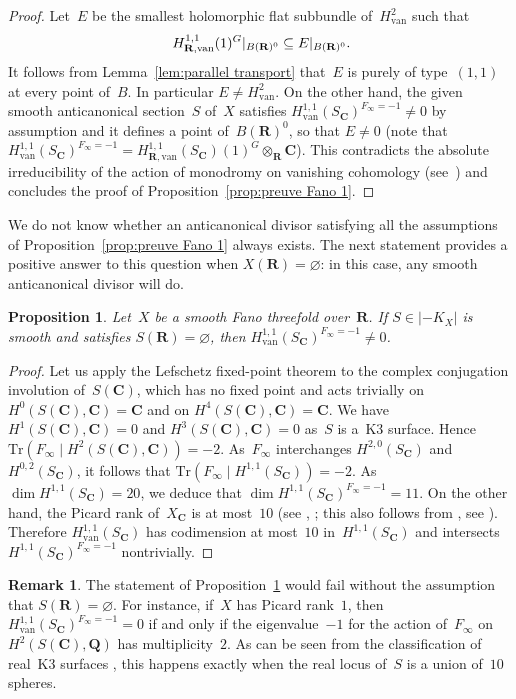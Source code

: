 \documentclass[JEP,XML,SOM,Unicode]{cedram}
\theoremstyle{plain}
\newtheorem{prop}[thm]{Proposition}
\theoremstyle{definition}
\newtheorem{rmk}[thm]{Remark}
\numberwithin{equation}{section}
\renewcommand{\C}{{\mathbf C}}
\newcommand{\Q}{{\mathbf Q}}
\newcommand{\R}{{\mathbf R}}
\newcommand{\Tr}{\mathrm{Tr}}
\renewcommand{\emptyset}{\varnothing}
\newcommand{\van}{\mathrm{van}}
\begin{document}
\begin{proof}
Let~$E$ be the smallest holomorphic flat subbundle of~$H^2_{\van}$
such that
\[
H^{1,1}_{\R,\van}(1)^G|_{B(\R)^0} \subseteq E|_{B(\R)^0}\rlap{\text{.}}
\]
It follows from
Lemma~\ref{lem:parallel transport}
that~$E$
is purely of type~$(1,1)$ at every point of~$B$.
In particular $E\neq H^2_\van$.
On the other hand, the given
smooth anticanonical section~$S$ of~$X$
satisfies $H_{\van}^{1,1}(S_{\C})^{F_\infty=-1}\neq 0$
by assumption and it defines a point of~$B(\R)^0$,
so that $E\neq 0$
(note
that $H_{\van}^{1,1}(S_{\C})^{F_\infty=-1}= H^{1,1}_{\R,\van}(S_\C)(1)^G \otimes_\R \C$).
This contradicts the absolute irreducibility of the action of monodromy on vanishing cohomology
(see~\cite[Th.\,7.3.2]{Lamotke}) and concludes the proof of Proposition~\ref{prop:preuve Fano 1}.
\end{proof}

We do not know whether an anticanonical divisor satisfying all the assumptions
of Proposition~\ref{prop:preuve Fano 1} always exists.
The next statement provides a positive answer to this question
when $X(\R)=\emptyset$:
in this case, any smooth anticanonical divisor will do.

\begin{prop}
\label{prop:good K3}
Let~$X$ be a smooth Fano threefold over~$\R$.
If $S\in |{-}K_X|$ is smooth and satisfies $S(\R)=\emptyset$,
then $H_{\van}^{1,1}(S_{\C})^{F_\infty=-1}\neq 0$.
\end{prop}

\begin{proof}
Let us apply the Lefschetz fixed-point theorem to
the complex conjugation involution of~$S(\C)$,
which has no fixed point
and
acts trivially
on $H^0(S(\C),\C)=\C$ and on $H^4(S(\C),\C)=\C$.
We have $H^1(S(\C),\C)=0$
and $H^3(S(\C),\C)=0$
as~$S$ is a~K3 surface.
Hence $\Tr(F_\infty\mid H^2(S(\C),\C))=-2$.
As~$F_\infty$ interchanges $H^{2,0}(S_{\C})$ and~$H^{0,2}(S_{\C})$,
it follows that
$\Tr(F_\infty\mid H^{1,1}(S_\C))=-2$.
As $\dim H^{1,1}(S_\C)=20$,
we deduce that $\dim H^{1,1}(S_\C)^{F_\infty=-1}=11$.
On the other hand, the Picard rank of~$X_{\C}$ is at most~$10$
(see \cite[Th.\,2]{morimukai81classification}, \cite[Th.\,1.2]{morimukai83onfano};
this also follows from \cite[Th.\,1.1]{casagrande},
see \cite[Th.\,1.3]{dellanoce}).
Therefore $H_{\van}^{1,1}(S_\C)$
has codimension at most~$10$ in~$H^{1,1}(S_{\C})$ and intersects $H^{1,1}(S_{\C})^{F_\infty=-1}$ nontrivially.
\end{proof}

\begin{rmk}
The statement of Proposition~\ref{prop:good K3} would fail
without the assumption that $S(\R)=\emptyset$. For instance,
if~$X$ has Picard rank~$1$, then $H_{\van}^{1,1}(S_{\C})^{F_\infty=-1}=0$
if and only if the eigenvalue~$-1$ for the action of~$F_{\infty}$ on $H^2(S(\C),\Q)$ has multiplicity~$2$. As can be seen from the classification of real~K3 surfaces \cite[Ch.\,VIII, §3]{silhol}, this happens exactly when the real locus of~$S$ is a union of~$10$ spheres.
\end{rmk}
\end{document}
